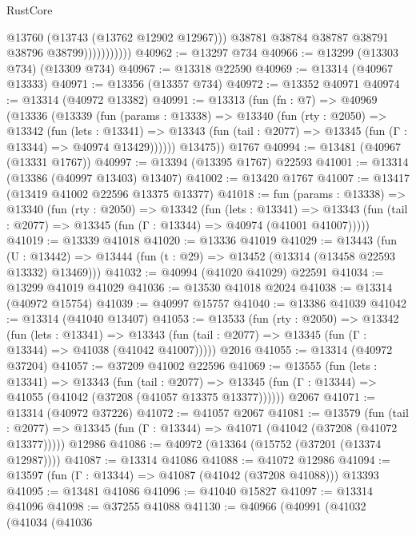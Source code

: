 \begin{lexlean}{RustCore}
\begin{coremodule}
                            @13760
                            (@13743 (@13762 @12902 @12967)))
                          @38781
                          @38784
                          @38787
                          @38791
                          @38796
                          @38799)))))))))))
@40962 := @13297 @734
@40966 := @13299 (@13303 @734) (@13309 @734)
@40967 := @13318 @22590
@40969 := @13314 (@40967 @13333)
@40971 := @13356 (@13357 @734)
@40972 := @13352 @40971
@40974 := @13314 (@40972 @13382)
@40991 := @13313
    (fun (fn : @7) =>
    @40969
      (@13336
        (@13339
          (fun (params : @13338) =>
          @13340
            (fun (rty : @2050) =>
            @13342
              (fun (lets : @13341) =>
              @13343 (fun (tail : @2077) => @13345 (fun (Γ : @13344) => @40974 @13429))))))
        @13475))
    @1767
@40994 := @13481 (@40967 (@13331 @1767))
@40997 := @13394 (@13395 @1767) @22593
@41001 := @13314 (@13386 (@40997 @13403) @13407)
@41002 := @13420 @1767
@41007 := @13417 (@13419 @41002 @22596 @13375 @13377)
@41018 := fun (params : @13338) =>
  @13340
    (fun (rty : @2050) =>
    @13342
      (fun (lets : @13341) =>
      @13343 (fun (tail : @2077) => @13345 (fun (Γ : @13344) => @40974 (@41001 @41007)))))
@41019 := @13339 @41018
@41020 := @13336 @41019
@41029 := @13443
    (fun (U : @13442) => @13444 (fun (t : @29) => @13452 (@13314 (@13458 @22593 @13332) @13469)))
@41032 := @40994 (@41020 @41029) @22591
@41034 := @13299 @41019 @41029
@41036 := @13530 @41018 @2024
@41038 := @13314 (@40972 @15754)
@41039 := @40997 @15757
@41040 := @13386 @41039
@41042 := @13314 (@41040 @13407)
@41053 := @13533
    (fun (rty : @2050) =>
    @13342
      (fun (lets : @13341) =>
      @13343 (fun (tail : @2077) => @13345 (fun (Γ : @13344) => @41038 (@41042 @41007)))))
    @2016
@41055 := @13314 (@40972 @37204)
@41057 := @37209 @41002 @22596
@41069 := @13555
    (fun (lets : @13341) =>
    @13343
      (fun (tail : @2077) =>
      @13345 (fun (Γ : @13344) => @41055 (@41042 (@37208 (@41057 @13375 @13377))))))
    @2067
@41071 := @13314 (@40972 @37226)
@41072 := @41057 @2067
@41081 := @13579
    (fun (tail : @2077) => @13345 (fun (Γ : @13344) => @41071 (@41042 (@37208 (@41072 @13377)))))
    @12986
@41086 := @40972 (@13364 (@15752 (@37201 (@13374 @12987))))
@41087 := @13314 @41086
@41088 := @41072 @12986
@41094 := @13597 (fun (Γ : @13344) => @41087 (@41042 (@37208 @41088))) @13393
@41095 := @13481 @41086
@41096 := @41040 @15827
@41097 := @13314 @41096
@41098 := @37255 @41088
@41130 := @40966
    (@40991
      (@41032
        (@41034
          (@41036

\end{coremodule}
\end{lexlean}
